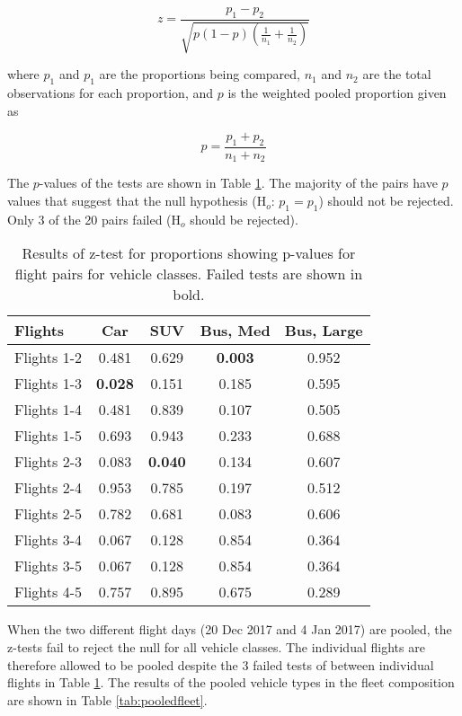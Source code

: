 \begin{equation}
z = \frac{p_{1}-p_{2}}{\sqrt{p(1-p)\left ( \frac{1}{n_{1}}+\frac{1}{n_{2}} \right )}}
\end{equation}

\noindent
where $p_{1}$ and $p_{1}$ are the proportions being compared, $n_{1}$ and $n_{2}$ are the total observations for each proportion, and $p$ is the weighted pooled proportion given as

\begin{equation}
p = \frac{p_{1}+p_{2}}{n_{1}+n_{2}}
\end{equation}

The $p$-values of the tests are shown in Table \ref{tab:ztestprop}. The majority of the pairs have $p$ values that suggest that the null hypothesis (H$_{o}$: $p_{1} = p_{1}$) should not be rejected. Only 3 of the 20 pairs failed (H$_{o}$ should be rejected).


\begin{table}[H]
\centering
\caption{Results of z-test for proportions showing p-values for flight pairs for vehicle classes. Failed tests are shown in bold.}
\label{tab:ztestprop}
\begin{tabular}{@{}lcccc@{}}
\toprule
\textbf{Flights} & \textbf{Car} & \textbf{SUV} & \textbf{Bus, Med} & \textbf{Bus, Large} \\ \midrule
Flights 1-2 & 0.481 & 0.629 & \textbf{0.003} & 0.952 \\
Flights 1-3 & \textbf{0.028} & 0.151 & 0.185 & 0.595 \\
Flights 1-4 & 0.481 & 0.839 & 0.107 & 0.505 \\
Flights 1-5 & 0.693 & 0.943 & 0.233 & 0.688 \\
Flights 2-3 & 0.083 & \textbf{0.040} & 0.134 & 0.607 \\
Flights 2-4 & 0.953 & 0.785 & 0.197 & 0.512 \\
Flights 2-5 & 0.782 & 0.681 & 0.083 & 0.606 \\
Flights 3-4 & 0.067 & 0.128 & 0.854 & 0.364 \\
Flights 3-5 & 0.067 & 0.128 & 0.854 & 0.364 \\
Flights 4-5 & 0.757 & 0.895 & 0.675 & 0.289 \\ \bottomrule
\end{tabular}
\end{table}

When the two different flight days (20 Dec 2017 and 4 Jan 2017) are pooled, the z-tests fail to reject the null for all vehicle classes.  The individual flights are therefore allowed to be pooled despite the 3 failed tests of between individual flights in Table \ref{tab:ztestprop}. The results of the pooled vehicle types in the fleet composition are shown in Table \ref{tab:pooledfleet}.

